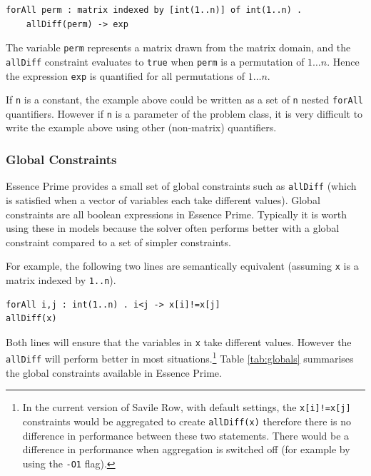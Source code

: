 \documentclass[a4paper]{article}
\newcommand{\eprime}{{\sc Essence Prime}\xspace}
\begin{document}
\begin{verbatim}
forAll perm : matrix indexed by [int(1..n)] of int(1..n) . 
    allDiff(perm) -> exp
\end{verbatim}

The variable \texttt{perm} represents a matrix drawn from the matrix domain, and the 
\texttt{allDiff} constraint evaluates to \texttt{true} when \texttt{perm} is a 
permutation of $1\ldots n$. Hence the expression \texttt{exp} is quantified for
all permutations of $1\ldots n$. 

If \texttt{n} is a constant, the example above could be written as a set of \texttt{n}
nested \texttt{forAll} quantifiers. However if \texttt{n} is a parameter of the 
problem class, it is very difficult to write the example above using other (non-matrix) 
quantifiers. 

\subsubsection{Global Constraints}

\eprime provides a small set of global constraints such as {\tt allDiff} (which is satisfied when a
vector of variables each take different values). Global constraints are all
boolean expressions in \eprime. 
Typically it is worth using these in models because the solver often performs
better with a global constraint compared to a set of simpler constraints. 

For example, the following two lines are semantically equivalent (assuming
{\tt x} is a matrix indexed by {\tt 1..n}). 

\begin{verbatim}
forAll i,j : int(1..n) . i<j -> x[i]!=x[j]
allDiff(x)
\end{verbatim}

Both lines will ensure that the variables in {\tt x} take different values. 
However the {\tt allDiff} will perform better in most situations.\footnote{In the 
current version of Savile Row, with default settings, the \texttt{x[i]!=x[j]} constraints would be aggregated to create \texttt{allDiff(x)} therefore there is no difference in performance between these two statements. 
There would be a difference in performance when aggregation is switched off (for example by using the \texttt{-O1} flag).}
Table \ref{tab:globals} summarises the global constraints available in \eprime.
\end{document}
